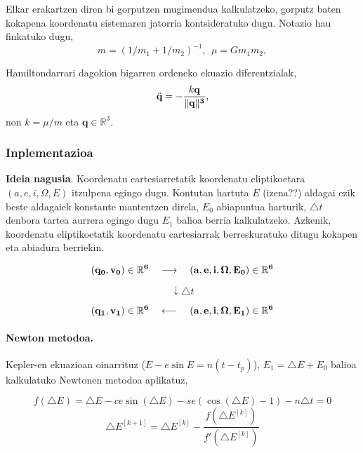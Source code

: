 Elkar erakartzen diren bi gorputzen mugimendua kalkulatzeko, gorputz baten kokapena koordenatu sistemaren jatorria kontsideratuko dugu. Notazio hau finkatuko dugu, 
\begin{equation*}
m=(1/m_1+1/m_2)^{-1},\ \ \mu=Gm_1m_2,
\end{equation*} 

Hamiltondarrari dagokion bigarren ordeneko ekuazio diferentzialak,
\begin{equation}
\ddot{\mathbf{q}}= - \frac{k\mathbf{q}}{\|\bf{q}\|^3} ,
\end{equation}
non $k= \mu / m$ eta  $\mathbf{q}\in \mathbb{R}^3$.


\subsubsection*{Inplementazioa}

\textbf{Ideia nagusia}. Koordenatu cartesiarretatik koordenatu eliptikoetara $(a,e,i,\Omega,E)$ itzulpena egingo dugu. Kontutan hartuta $E$ (izena??) aldagai ezik beste aldagaiek konstante mantentzen direla, $E_0$ abiapuntua harturik, $\triangle t$ denbora tartea aurrera egingo dugu $E_1$ balioa berria kalkulatzeko. Azkenik, koordenatu eliptikoetatik koordenatu cartesiarrak berreskuratuko ditugu kokapen eta abiadura berriekin. 

\begin{equation*}
(\bf{q_0},\bf{v_0}) \in \mathbb{R}^6 \ \ \ \longrightarrow \ \ \  (a,e,i,\Omega,E_0) \in \mathbb{R}^6 
\end{equation*}

\begin{equation*}
\downarrow \triangle t
\end{equation*}

\begin{equation*}
(\bf{q_1},\bf{v_1}) \in \mathbb{R}^6 \ \ \ \longleftarrow \ \ \  (a,e,i,\Omega,E_1) \in \mathbb{R}^6 
\end{equation*}

\paragraph*{\textbf{Newton metodoa}.} Kepler-en ekuazioan oinarrituz ($E-e\sin E=n (t-t_p)$),  $E_1=\triangle E+E_0$ balioa kalkulatuko Newtonen metodoa aplikatuz,

\begin{equation*}
f(\triangle E)=\triangle E - ce \sin(\triangle E)- se (\cos(\triangle E)-1)-n \triangle t=0
\end{equation*}
\begin{equation}
\triangle E^{[k+1]}=\triangle E^{[k]}- \frac{f(\triangle E^{[k]})}{f'(\triangle E^{[k]})}
\end{equation}

